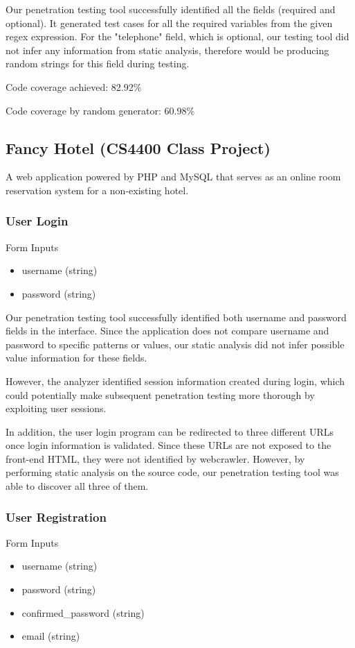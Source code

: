 Our penetration testing tool successfully identified all the fields (required and optional). It generated test cases for all the required variables from the given regex expression. For the "telephone" field, which is optional, our testing tool did not infer any information from static analysis, therefore would be producing random strings for this field during testing.

Code coverage achieved: 82.92\%

Code coverage by random generator: 60.98\%

\subsection{Fancy Hotel (CS4400 Class Project)}
A web application powered by PHP and MySQL that serves as an online room reservation system for a non-existing hotel.

\subsubsection{User Login}
Form Inputs
\begin{itemize}
\item username (string)
\item password (string)
\end{itemize}

Our penetration testing tool successfully identified both username and password fields in the interface. Since the application does not compare username and password to specific patterns or values, our static analysis did not infer possible value information for these fields. 

However, the analyzer identified session information created during login, which could potentially make subsequent penetration testing more thorough by exploiting user sessions.

In addition, the user login program can be redirected to three different URLs once login information is validated. Since these URLs are not exposed to the front-end HTML, they were not identified by webcrawler. However, by performing static analysis on the source code, our penetration testing tool was able to discover all three of them.

\subsubsection{User Registration}
Form Inputs
\begin{itemize}
\item username (string)
\item password (string)
\item confirmed\_password (string)
\item email (string)
\end{itemize}


